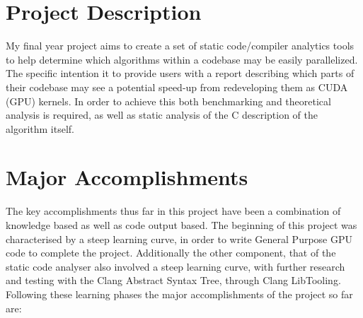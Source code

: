 
\section{Project Description}
My final year project aims to create a set of static code/compiler analytics tools to help determine which algorithms within a codebase may be easily parallelized. The specific intention it to provide users with a report describing which parts of their codebase may see a potential speed-up from redeveloping them as CUDA (GPU) kernels. In order to achieve this both benchmarking and theoretical analysis is required, as well as static analysis of the C description of the algorithm itself.

\section{Major Accomplishments}
The key accomplishments thus far in this project have been a combination of knowledge based as well as code output based. The beginning of this project was characterised by a steep learning curve, in order to write General Purpose GPU code to complete the project. Additionally the other component, that of the static code analyser also involved a steep learning curve, with further research and testing with the Clang Abstract Syntax Tree, through Clang LibTooling. Following these learning phases the major accomplishments of the project so far are:

